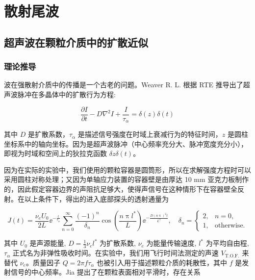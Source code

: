 
\chapter{散射尾波}

\section{超声波在颗粒介质中的扩散近似}

\subsection{理论推导}

波在强散射介质中的传播是一个古老的问题。Weaver R. L. 根据 RTE 推导出了超声波脉冲在多晶体中的扩散行为方程\cite{diffusivity}:

\begin{equation}
  \frac{\partial I}{\partial t} - D\nabla^{2}I + \frac{I}{\tau_{\alpha}} = \delta(z)\delta(t)
\end{equation}

其中 $D$ 是扩散系数，$\tau_{\alpha}$ 是描述信号强度在时域上衰减行为的特征时间，$z$ 是圆柱坐标系中的轴向坐标。因为是超声波脉冲（中心频率充分大、脉冲宽度充分小），即视为时域和空间上的狄拉克函数 $\delta{z}\delta(t)$。

因为在实际的实验中，我们使用的颗粒容器是圆筒形，所以在求解强度方程时可以采用圆柱对称处理；又因为单轴应力装置的容器壁是由厚达 10 \unit{\milli\meter} 亚克力板制作的，因此假定容器边界的声阻抗足够大，使得声信号在这种情形下在容器壁全反射。在以上条件下，得出的进入底部探头的透射通量\cite{PhysRevLett.93.154303}为

\begin{equation}
  J(t) = \frac{\nu_{e} U_{0}}{2L}{\ee}^{-\frac{t}{\tau_{\alpha}}}\sum_{n=0}^{\infty}\frac{(-1)^{n}}{\delta_{n}}\cos{\left(\frac{n\uppi l^{*}}{L}\right)}{\ee}^{-\frac{D(n\uppi)^{2}t}{L^{2}}},\quad \delta_{n} = \begin{cases}
    2, & n = 0, \\
    1, & \text{otherwise}.
  \end{cases}\label{eq:diffusion_approximation}
\end{equation}

其中 $U_{0}$ 是声源能量, $D = \frac{1}{3}\nu_{e}l^{*}$ 为扩散系数, $\nu_{e}$ 为能量传输速度, $l^{*}$ 为平均自由程, $\tau_{\alpha}$ 正式名为非弹性吸收时间。在实验中，我们用飞行时间法测定的声速 $V_{\text{T.O.F.}}$ 来替代 $\nu_{e}$。质量因子 $Q = 2\pi f\tau_{\alpha}$ 也被引入用于描述颗粒介质的耗散性，其中 $f$ 是发射信号的中心频率。Jia 提出了在颗粒表面相对平滑时，存在关系\cite{PhysRevLett.101.138001}


